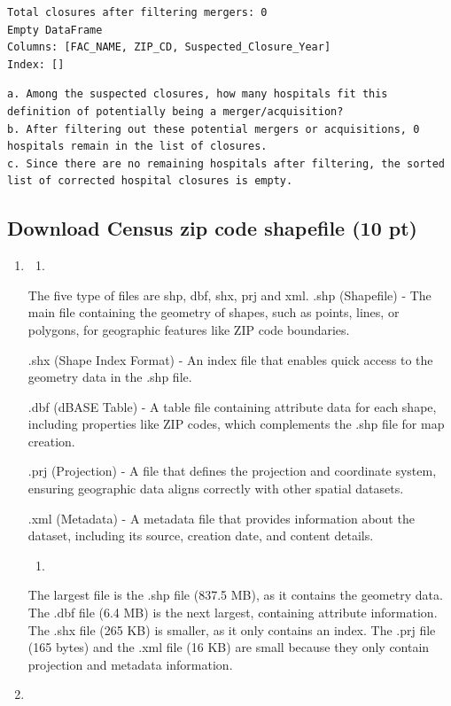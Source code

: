 \documentclass[
  letterpaper,
  DIV=11,
  numbers=noendperiod]{scrartcl}
\providecommand{\tightlist}{%
  \setlength{\itemsep}{0pt}\setlength{\parskip}{0pt}}\usepackage{longtable,booktabs,array}
\begin{document}
\begin{verbatim}
Total closures after filtering mergers: 0
Empty DataFrame
Columns: [FAC_NAME, ZIP_CD, Suspected_Closure_Year]
Index: []
\end{verbatim}

\begin{verbatim}
a. Among the suspected closures, how many hospitals fit this definition of potentially being a merger/acquisition?
b. After filtering out these potential mergers or acquisitions, 0 hospitals remain in the list of closures.
c. Since there are no remaining hospitals after filtering, the sorted list of corrected hospital closures is empty.
\end{verbatim}

\subsection{Download Census zip code shapefile (10
pt)}\label{download-census-zip-code-shapefile-10-pt}

\begin{enumerate}
\def\labelenumi{\arabic{enumi}.}
\item
  \begin{enumerate}
  \def\labelenumii{\alph{enumii}.}
  \tightlist
  \item
  \end{enumerate}

  The five type of files are shp, dbf, shx, prj and xml. .shp
  (Shapefile) - The main file containing the geometry of shapes, such as
  points, lines, or polygons, for geographic features like ZIP code
  boundaries.

  .shx (Shape Index Format) - An index file that enables quick access to
  the geometry data in the .shp file.

  .dbf (dBASE Table) - A table file containing attribute data for each
  shape, including properties like ZIP codes, which complements the .shp
  file for map creation.

  .prj (Projection) - A file that defines the projection and coordinate
  system, ensuring geographic data aligns correctly with other spatial
  datasets.

  .xml (Metadata) - A metadata file that provides information about the
  dataset, including its source, creation date, and content details.

  \begin{enumerate}
  \def\labelenumii{\alph{enumii}.}
  \setcounter{enumii}{1}
  \tightlist
  \item
  \end{enumerate}

  The largest file is the .shp file (837.5 MB), as it contains the
  geometry data. The .dbf file (6.4 MB) is the next largest, containing
  attribute information. The .shx file (265 KB) is smaller, as it only
  contains an index. The .prj file (165 bytes) and the .xml file (16 KB)
  are small because they only contain projection and metadata
  information.
\item
\end{enumerate}
\end{document}
